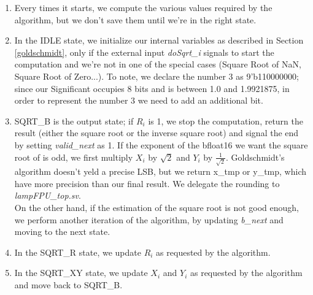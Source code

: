 \begin{enumerate}
\item Every times it starts, we compute the various values required by the algorithm, but we don't save them until we're in the right state.
\item In the IDLE state, we initialize our internal variables as described in Section \ref{goldschmidt}, only if the external input \emph{doSqrt\_i} signals to start the computation and we're not in one of the special cases (Square Root of NaN, Square Root of Zero...). To note, we declare the number 3 as 9'b110000000; since our Significant occupies 8 bits and is between 1.0 and 1.9921875, in order to represent the number 3 we need to add an additional bit. 
\item SQRT\_B is the output state; if $R_i$ is 1, we stop the computation, return the result (either the square root or the inverse square root) and signal the end by setting \emph{valid\_next} as 1. If the exponent of the bfloat16 we want the square root of is odd, we first multiply $X_i$ by $\sqrt{2}$ and $Y_i$ by $\frac{1}{\sqrt{2}}$. Goldschmidt's algorithm doesn't yeld a precise LSB, but we return x\_tmp or y\_tmp, which have more precision than our final result. We delegate the rounding to \emph{lampFPU\_top.sv}. \\
On the other hand, if the estimation of the square root is not good enough, we perform another iteration of the algorithm, by updating \emph{b\_next} and moving to the next state.
\item In the SQRT\_R state, we update $R_i$ as requested by the algorithm.
\item In the SQRT\_XY state, we update $X_i$ and $Y_i$ as requested by the algorithm and move back to SQRT\_B.
\end{enumerate}

